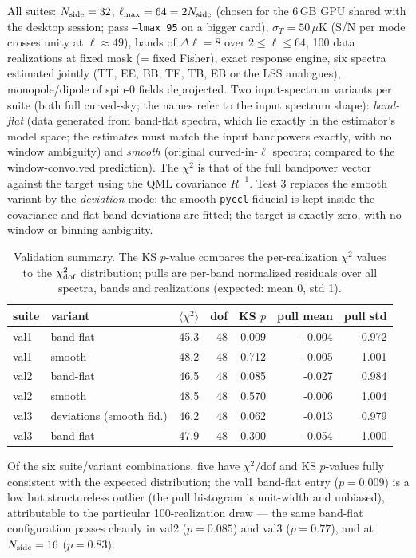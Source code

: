All suites: $N_{\rm side}=32$, $\ell_{\max}=64=2N_{\rm side}$ (chosen for the 6\,GB GPU shared with the desktop session; pass \texttt{--lmax 95} on a bigger card), $\sigma_T=50\,\mu$K (S/N per mode crosses unity at $\ell\approx49$), bands of $\Delta\ell=8$ over $2\le\ell\le64$, 100 data realizations at fixed mask (= fixed Fisher), exact response engine, six spectra estimated jointly (TT, EE, BB, TE, TB, EB or the LSS analogues), monopole/dipole of spin-0 fields deprojected.  Two input-spectrum variants per suite (both full curved-sky; the names refer to the input spectrum shape): \emph{band-flat} (data generated from band-flat spectra, which lie exactly in the estimator's model space; the estimates must match the input bandpowers exactly, with no window ambiguity) and \emph{smooth} (original curved-in-$\ell$ spectra; compared to the window-convolved prediction).  The $\chi^2$ is that of the full bandpower vector against the target using the QML covariance $R^{-1}$.  Test 3 replaces the smooth variant by the \emph{deviation} mode: the smooth \texttt{pyccl} fiducial is kept inside the covariance and flat band deviations are fitted; the target is exactly zero, with no window or binning ambiguity.
\begin{table}[h]\centering\small
\begin{tabular}{llrrrrr}
\toprule
suite & variant & $\langle\chi^2\rangle$ & dof & KS $p$ & pull mean & pull std \\
\midrule
val1 & band-flat & 45.3 & 48 & 0.009 & +0.004 & 0.972 \\
val1 & smooth & 48.2 & 48 & 0.712 & -0.005 & 1.001 \\
val2 & band-flat & 46.5 & 48 & 0.085 & -0.027 & 0.984 \\
val2 & smooth & 48.5 & 48 & 0.570 & -0.006 & 1.004 \\
val3 & deviations (smooth fid.) & 46.2 & 48 & 0.062 & -0.013 & 0.979 \\
val3 & band-flat & 47.9 & 48 & 0.300 & -0.054 & 1.000 \\
\bottomrule
\end{tabular}
\caption{Validation summary.  The KS $p$-value compares the per-realization $\chi^2$ values to the $\chi^2_{\rm dof}$ distribution; pulls are per-band normalized residuals over all spectra, bands and realizations (expected: mean 0, std 1).}
\end{table}
Of the six suite/variant combinations, five have $\chi^2/\mathrm{dof}$ and KS $p$-values fully consistent with the expected distribution; the val1 band-flat entry ($p=0.009$) is a low but structureless outlier (the pull histogram is unit-width and unbiased), attributable to the particular 100-realization draw --- the same band-flat configuration passes cleanly in val2 ($p=0.085$) and val3 ($p=0.77$), and at $N_{\rm side}=16$ ($p=0.83$).

